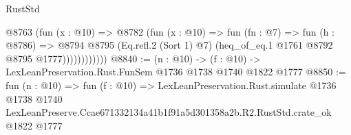 \begin{lexlean}{RustStd}
\begin{coremodule}
                    @8763
                      (fun (x : @10) =>
                      @8782
                        (fun (x : @10) =>
                        fun (fn : @7) =>
                        fun (h : @8786) =>
                        @8794
                          @8795
                          (Eq.refl.{2} (Sort 1) @7)
                          (heq_of_eq.{1} @1761 @8792 @8795 @1777))))))))))))
@8840 := (n : @10) -> (f : @10) -> LexLeanPreservation.Rust.FunSem @1736 @1738 @1740 @1822 @1777
@8850 := fun (n : @10) =>
  fun (f : @10) =>
  LexLeanPreservation.Rust.simulate
    @1736
    @1738
    @1740
    LexLeanPreserve.Ccae671332134a41b1f91a5d301358a2b.R2.RustStd.crate_ok
    @1822
    @1777
\end{coremodule}
\end{lexlean}
